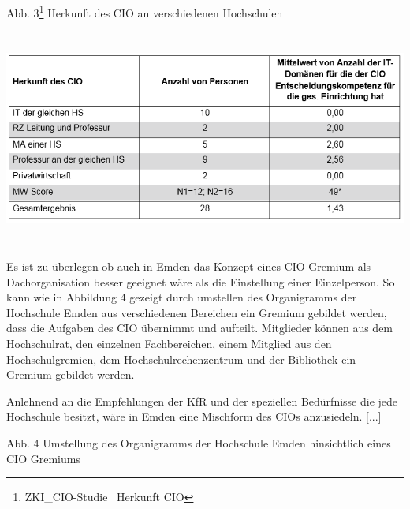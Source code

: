 \documentclass{article}
\begin{document}
Abb. 3\footnote{ZKI\_CIO-Studie \ Herkunft CIO} Herkunft des CIO an verschiedenen Hochschulen

\begin{center}
\includegraphics[width=16.722cm,height=7.121cm]{INMGruppe6TeilCIO-img/INMGruppe6TeilCIO-img003.png}
\end{center}

\bigskip

Es ist zu überlegen ob auch in Emden das Konzept eines CIO Gremium als Dachorganisation besser geeignet wäre als die
Einstellung einer Einzelperson. So kann wie in Abbildung 4 gezeigt durch umstellen des Organigramms der Hochschule
Emden aus verschiedenen Bereichen ein Gremium gebildet werden, dass die Aufgaben des CIO übernimmt und aufteilt.
Mitglieder können aus dem Hochschulrat, den einzelnen Fachbereichen, einem Mitglied aus den Hochschulgremien, dem
Hochschulrechenzentrum und der Bibliothek ein Gremium gebildet werden. 

Anlehnend an die Empfehlungen der KfR und der speziellen Bedürfnisse die jede Hochschule besitzt, wäre in Emden eine
Mischform des CIOs anzusiedeln. [...]

Abb. 4 Umstellung des Organigramms der Hochschule Emden hinsichtlich eines CIO Gremiums
\end{document}

